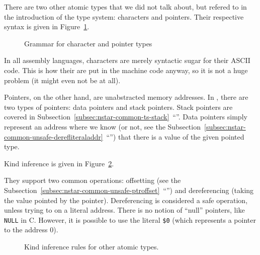 There are two other atomic types that we did not talk about, but refered to in the introduction of the type system: characters and pointers. Their respective syntax is given in Figure~\ref{fig:nstar-common-ts-atomic-syntax}.

\begin{figure}[htb]
  \centering
  \caption{Grammar for character and pointer types}
  \label{fig:nstar-common-ts-atomic-syntax}
\end{figure}

In all assembly languages, characters are merely syntactic sugar for their ASCII code. This is how their are put in the machine code anyway, so it is not a huge problem (it might even not be at all).

Pointers, on the other hand, are unabstracted memory addresses.
In \nstar, there are two types of pointers: data pointers and stack pointers.
Stack pointers are covered in Subsection~\ref{subsec:nstar-common-ts-stack}~``''.
Data pointers simply represent an address where we know (or not, see the Subsection~\ref{subsec:nstar-common-unsafe-derefliteraladdr}~``'') that there is a value of the given pointed type.

Kind inference is given in Figure~\ref{fig:nstar-common-ts-atomic-kindrules}.

They support two common operations: offsetting (see the Subsection~\ref{subsec:nstar-common-unsafe-ptroffset}~``'') and dereferencing (taking the value pointed by the pointer).
Dereferencing is considered a safe operation, unless trying to on a literal address.
There is no notion of ``null'' pointers, like \texttt{NULL} in C.
However, it is possible to use the literal \texttt{\$0} (which represents a pointer to the address $0$).

\begin{figure}[htb]
  \centering

  \caption{Kind inference rules for other atomic types.}
  \label{fig:nstar-common-ts-atomic-kindrules}
\end{figure}

